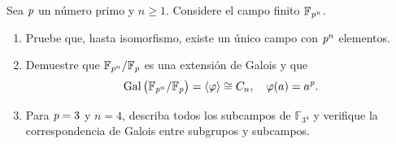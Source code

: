 \begin{ejer}
Sea $\operatorname{\textit{p}}$ un número primo y $n \geq 1$. Considere el campo finito $\mathbb{F}_{\operatorname{\textit{p}}^n}$.

\begin{enumerate}[label=\alph*)]
\item Pruebe que, hasta isomorfismo, existe un único campo con $\operatorname{\textit{p}}^n$ elementos.

\item Demuestre que $\mathbb{F}_{\operatorname{\textit{p}}^n} / \mathbb{F}_{\operatorname{\textit{p}}}$ es una extensión de Galois y que  
\[
\operatorname{Gal}{\big(\mathbb{F}_{\operatorname{\textit{p}}^n} / \mathbb{F}_{\operatorname{\textit{p}}}\big)} = \langle \varphi \rangle \cong C_n, \quad \varphi(a) = a^{\operatorname{\textit{p}}}.
\]

\item Para $\operatorname{\textit{p}} = 3$ y $n = 4$, describa todos los subcampos de $\mathbb{F}_{3^4}$ y verifique la correspondencia de Galois entre subgrupos y subcampos.
\end{enumerate}
\end{ejer}
